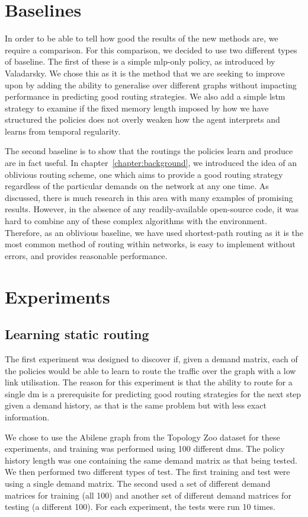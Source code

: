 \section{Baselines}
In order to be able to tell how good the results of the new methods are, we require a comparison. For this comparison, we decided to use two different types of baseline. The first of these is a simple \ac{mlp}-only policy, as introduced by Valadarsky. We chose this as it is the method that we are seeking to improve upon by adding the ability to generalise over different graphs without impacting performance in predicting good routing strategies. We also add a simple \ac{lstm} strategy to examine if the fixed memory length imposed by how we have structured the policies does not overly weaken how the agent interprets and learns from temporal regularity.

The second baseline is to show that the routings the policies learn and produce are in fact useful. In chapter~\ref{chapter:background}, we introduced the idea of an oblivious routing scheme, one which aims to provide a good routing strategy regardless of the particular demands on the network at any one time. As discussed, there is much research in this area with many examples of promising results. However, in the absence of any readily-available open-source code, it was hard to combine any of these complex algorithms with the environment. Therefore, as an oblivious baseline, we have used shortest-path routing as it is the most common method of routing within networks, is easy to implement without errors, and provides reasonable performance.

\section{Experiments}

\subsection{Learning static routing}
\label{section:exp_static}
The first experiment was designed to discover if, given a demand matrix, each of the policies would be able to learn to route the traffic over the graph with a low link utilisation. The reason for this experiment is that the ability to route for a single \ac{dm} is a prerequisite for predicting good routing strategies for the next step given a demand history, as that is the same problem but with less exact information.

We chose to use the Abilene graph from the Topology Zoo dataset for these experiments, and training was performed using 100 different \acp{dm}. The policy history length was one containing the same demand matrix as that being tested. We then performed two different types of test. The first training and test were using a single demand matrix. The second used a set of different demand matrices for training (all 100) and another set of different demand matrices for testing (a different 100). For each experiment, the tests were run 10 times.

